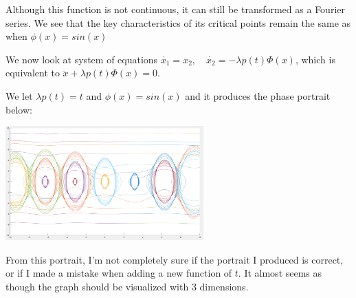 \documentclass{article}
\begin{document}
\raggedright
Although this function is not continuous, it can still be transformed as a Fourier series. We see that the key characteristics of its critical points remain the same as when $\phi(x) = sin(x)$

\newpage
We now look at system of equations ${\dot{x_1}} = {x_2}, \quad {\dot{x_2}} = -{\lambda}p(t)\Phi(x)$, which is equivalent to ${\ddot{x}} + {\lambda}p(t)\Phi(x) = 0$.

We let ${\lambda}p(t) = t$ and $\phi(x) = sin(x)$ and it produces the phase portrait below:
\linebreak

\centering
\includegraphics[width=3in]{t_sin_x.png}
\linebreak

\raggedright
From this portrait, I'm not completely sure if the portrait I produced is correct, or if I made a mistake when adding a new function of $t$. It almost seems as though the graph should be visualized with 3 dimensions. 
\end{document}
